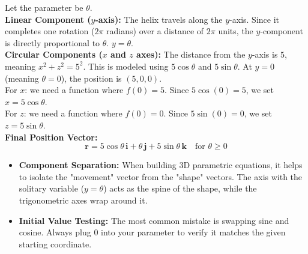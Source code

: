 \begin{solution}
Let the parameter be $\theta$. \\
\textbf{Linear Component ($y$-axis):} The helix travels along the $y$-axis. Since it completes one rotation ($2\pi$ radians) over a distance of $2\pi$ units, the $y$-component is directly proportional to $\theta$. $y = \theta$. \\
\textbf{Circular Components ($x$ and $z$ axes):} The distance from the $y$-axis is $5$, meaning $x^2 + z^2 = 5^2$. This is modeled using $5\cos\theta$ and $5\sin\theta$. At $y = 0$ (meaning $\theta = 0$), the position is $(5, 0, 0)$. \\
For $x$: we need a function where $f(0) = 5$. Since $5\cos(0) = 5$, we set $x = 5\cos\theta$. \\
For $z$: we need a function where $f(0) = 0$. Since $5\sin(0) = 0$, we set $z = 5\sin\theta$. \\
\textbf{Final Position Vector:}
$$ \mathbf{r} = 5\cos\theta \, \mathbf{i} + \theta \, \mathbf{j} + 5\sin\theta \, \mathbf{k} \quad \text{for } \theta \ge 0 $$
\end{solution}

\begin{takeaways}
\begin{itemize}[leftmargin=*]
    \item \textbf{Component Separation:} When building 3D parametric equations, it helps to isolate the "movement" vector from the "shape" vectors. The axis with the solitary variable ($y = \theta$) acts as the spine of the shape, while the trigonometric axes wrap around it. 
    \item \textbf{Initial Value Testing:} The most common mistake is swapping sine and cosine. Always plug $0$ into your parameter to verify it matches the given starting coordinate.
\end{itemize}
\end{takeaways}

\vspace{1em}

